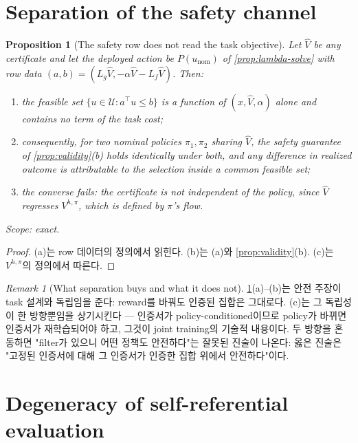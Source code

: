 \documentclass[11pt]{article}
\theoremstyle{plain}
\newtheorem{proposition}[theorem]{Proposition}
\theoremstyle{definition}
\theoremstyle{remark}
\newtheorem{remark}[theorem]{Remark}
\newcommand{\calU}{\mathcal{U}}
\newcommand{\Vhat}{\widehat V}
\newcommand{\Lg}{L_g}
\newcommand{\Lf}{L_f}
\begin{document}
\section{Separation of the safety channel}\label{sec:di-sep}

\begin{proposition}[The safety row does not read the task objective]\label{prop:di-sep}
Let $\Vhat$ be any certificate and let the deployed action be
$P(u_{\mathrm{nom}})$ of \cref{prop:lambda-solve} with row data $(a,b)=(\Lg\Vhat,-\alpha\Vhat-\Lf\Vhat)$.
Then:
\begin{enumerate}[label=(\alph*)]
  \item the feasible set $\{u\in\calU:a^\top u\le b\}$ is a function of $(x,\Vhat,\alpha)$ alone
  and contains no term of the task cost;
  \item consequently, for two nominal policies $\pi_1,\pi_2$ sharing $\Vhat$, the safety
  guarantee of \cref{prop:validity}(b) holds identically under both, and any difference in
  realized outcome is attributable to the selection inside a common feasible set;
  \item the converse fails: the certificate is not independent of the policy, since
  $\Vhat$ regresses $V^{h,\pi}$, which is defined by $\pi$'s flow.
\end{enumerate}
Scope: exact.
\end{proposition}
\begin{proof}
(a)는 row 데이터의 정의에서 읽힌다. (b)는 (a)와 \cref{prop:validity}(b). (c)는 $V^{h,\pi}$의
정의에서 따른다.
\end{proof}

\begin{remark}[What separation buys and what it does not]\label{rem:di-sep}
\cref{prop:di-sep}(a)--(b)는 안전 주장이 task 설계와 독립임을 준다: reward를 바꿔도 인증된 집합은
그대로다. (c)는 그 독립성이 한 방향뿐임을 상기시킨다 --- 인증서가 policy-conditioned이므로 policy가
바뀌면 인증서가 재학습되어야 하고, 그것이 joint training의 기술적 내용이다. 두 방향을 혼동하면
"filter가 있으니 어떤 정책도 안전하다"는 잘못된 진술이 나온다: 옳은 진술은 "고정된 인증서에 대해
그 인증서가 인증한 집합 위에서 안전하다"이다.
\end{remark}

\section{Degeneracy of self-referential evaluation}\label{sec:di-self}
\end{document}
